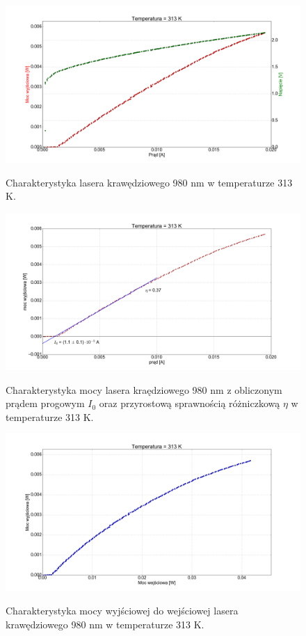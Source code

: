 \documentclass[a4paper, portrait,12pt]{report}
\begin{document}
\begin{figure}
\center
  \includegraphics[scale=0.30]{plot980/temp_40_IVL.png}
  \label{rys1}
  \caption{Charakterystyka lasera krawędziowego 980 nm w temperaturze 313 K.} 
\end{figure}


\begin{figure}
\center
  \includegraphics[scale=0.30]{plot980/temp_40_fit.png}
  \label{rys1}
  \caption{Charakterystyka mocy lasera kraędziowego 980 nm z obliczonym prądem progowym $I_0$ oraz przyrostową sprawnością różniczkową $\eta$ w temperaturze 313 K.} 
\end{figure}

\begin{figure}
\center
  \includegraphics[scale=0.30]{plot980/temp_40_power.png}
  \label{rys1}
  \caption{Charakterystyka mocy wyjściowej do wejściowej lasera krawędziowego 980 nm w temperaturze 313 K.} 
\end{figure}
\end{document}
